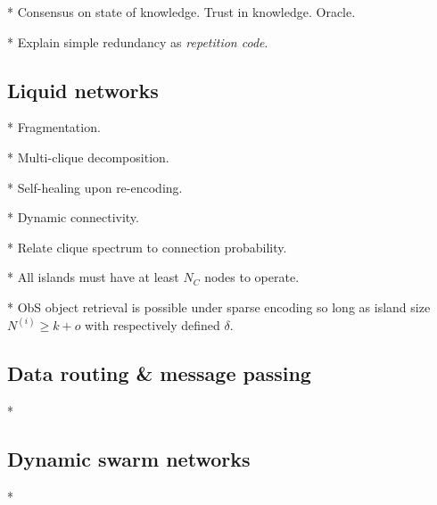 * Consensus on state of knowledge. Trust in knowledge. Oracle.

* Explain simple redundancy as \emph{repetition code}.

\subsection{Liquid networks}

* Fragmentation.

* Multi-clique decomposition.

* Self-healing upon re-encoding.

* Dynamic connectivity.

* Relate clique spectrum to connection probability.

* All islands must have at least $N_C$ nodes to operate.

* ObS object retrieval is possible under sparse encoding so long as island size $N^{(i)}\geq k+o$ with respectively defined $\delta$.

\subsection{Data routing \& message passing}

*

\subsection{Dynamic swarm networks}

* 